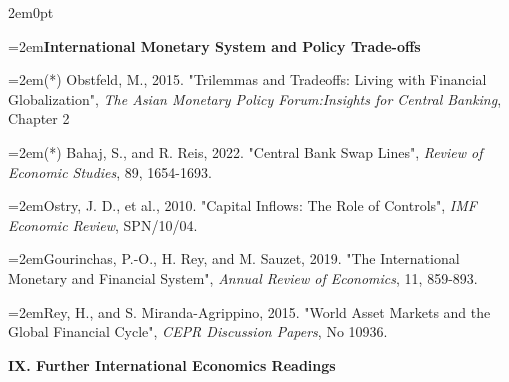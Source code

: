 \documentclass[10pt]{article}
\newcommand{\reading}{\par\hangindent=2em\hangafter=1\noindent}
\newenvironment{readingsblock}{%
  \begin{adjustwidth}{2em}{0pt} %
}{%
  \end{adjustwidth}
}
\begin{document}
\begin{readingsblock}
  \reading \textbf{International Monetary System and Policy Trade-offs} \\[4pt]
  
  \reading (*) Obstfeld, M., 2015. "Trilemmas and Tradeoffs: Living with Financial Globalization",
  {\it The Asian Monetary Policy Forum:Insights for Central Banking}, Chapter 2
  
  \reading (*) Bahaj, S., and R. Reis, 2022. "Central Bank Swap Lines", {\it Review of Economic Studies}, 89, 1654-1693.
  
  \reading Ostry, J. D., et al., 2010. "Capital Inflows: The Role of Controls",
  {\it IMF Economic Review}, SPN/10/04.
  
  \reading Gourinchas, P.-O., H. Rey, and M. Sauzet, 2019. "The International Monetary and Financial System",
  {\it Annual Review of Economics}, 11, 859-893. 
  
  \reading Rey, H., and S. Miranda-Agrippino, 2015. "World Asset Markets and the Global Financial Cycle", {\it CEPR Discussion Papers}, No 10936.
  \\[4pt]
  
  \end{readingsblock}
  
  
  
\noindent \textbf{IX. Further International Economics Readings} \\[6pt]
\end{document}
